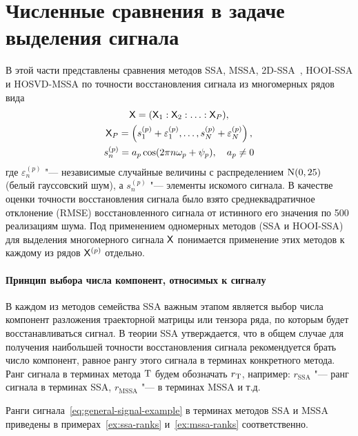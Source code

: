 \documentclass[specialist,
    substylefile=spbu.rtx,
    subf,href,colorlinks=true, 12pt]{disser}
\theoremstyle{plain}
\theoremstyle{definition}
\theoremstyle{remark}
\begin{document}
    \section{Численные сравнения в задаче выделения сигнала}\label{sec:numerical-compar}
    В этой части представлены сравнения методов SSA, MSSA, 2D-SSA~\cite{2d-ssa}, HOOI-SSA и HOSVD-MSSA
    по точности восстановления сигнала из многомерных рядов вида
    \begin{gather}
        \mathsf{X} = (\mathsf{X}_1: \mathsf{X}_2 : \ldots: \mathsf{X}_P), \nonumber \\
        \mathsf{X}_P = \left(s_1^{(p)} + \varepsilon_1^{(p)}, \ldots, s_N^{(p)} + \varepsilon_N^{(p)}\right),\nonumber \\
        s_n^{(p)} = a_p \cos(2\pi n \omega_p + \psi_p), \quad a_p \ne 0 \label{eq:general-signal-example}
    \end{gather}
    где $\varepsilon_n^{(p)}$ "--- независимые случайные величины с распределением $\mathrm{N}(0, 25)$
    (белый гауссовский шум), а $s_n^{(p)}$ "--- элементы искомого сигнала.
    В качестве оценки точности восстановления сигнала было взято среднеквадратичное отклонение (RMSE)
    восстановленного сигнала от истинного его значения по 500 реализациям шума.
    Под применением одномерных методов (SSA и HOOI-SSA) для выделения многомерного сигнала $\mathsf{X}$ понимается
    применение этих методов к каждому из рядов $\mathsf{X}^{(p)}$ отдельно.

    \paragraph{Принцип выбора числа компонент, относимых к сигналу}\label{subsec:example-signal-ranks}
    В каждом из методов семейства SSA важным этапом является выбор числа компонент разложения траекторной матрицы
    или тензора ряда, по которым будет восстанавливаться сигнал.
    В теории SSA утверждается, что в общем случае для получения наибольшей точности восстановления
    сигнала рекомендуется брать число компонент, равное рангу этого сигнала в терминах конкретного метода.
    Ранг сигнала в терминах метода $\mathrm{T}$ будем обозначать $r_{\mathrm{T}}$, например: $r_\text{SSA}$ "---
    ранг сигнала в терминах SSA, $r_\text{MSSA}$ "--- в терминах MSSA и т.д.

    Ранги сигнала~\eqref{eq:general-signal-example} в терминах методов SSA и MSSA приведены в
    примерах~\ref{ex:ssa-ranks} и~\ref{ex:mssa-ranks} соответственно.
\end{document}
